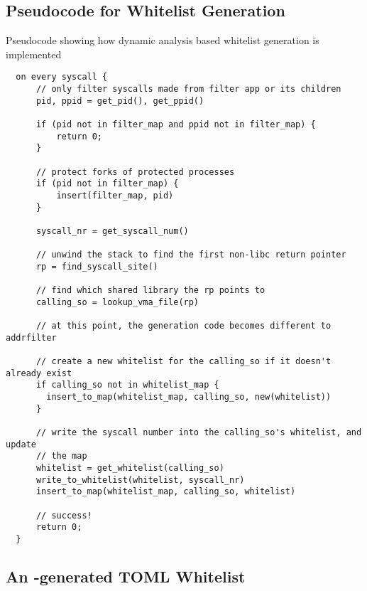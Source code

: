 \subsection{Pseudocode for Whitelist Generation}\label{subsec:apx-wlgen-pseudocde}

\begin{listing}[H]
  \caption{Pseudocode showing how dynamic analysis based whitelist generation is
  implemented}\label{lst:generator-pseudocode}
  \begin{verbatim}
  on every syscall {
      // only filter syscalls made from filter app or its children
      pid, ppid = get_pid(), get_ppid()

      if (pid not in filter_map and ppid not in filter_map) {
          return 0;
      }

      // protect forks of protected processes
      if (pid not in filter_map) {
          insert(filter_map, pid)
      }

      syscall_nr = get_syscall_num()

      // unwind the stack to find the first non-libc return pointer
      rp = find_syscall_site()

      // find which shared library the rp points to
      calling_so = lookup_vma_file(rp)

      // at this point, the generation code becomes different to addrfilter

      // create a new whitelist for the calling_so if it doesn't already exist
      if calling_so not in whitelist_map {
        insert_to_map(whitelist_map, calling_so, new(whitelist))
      }

      // write the syscall number into the calling_so's whitelist, and update
      // the map
      whitelist = get_whitelist(calling_so)
      write_to_whitelist(whitelist, syscall_nr)
      insert_to_map(whitelist_map, calling_so, whitelist)
        
      // success!
      return 0;
  }
  \end{verbatim}
\end{listing}



\subsection{An \afss-generated TOML Whitelist}

